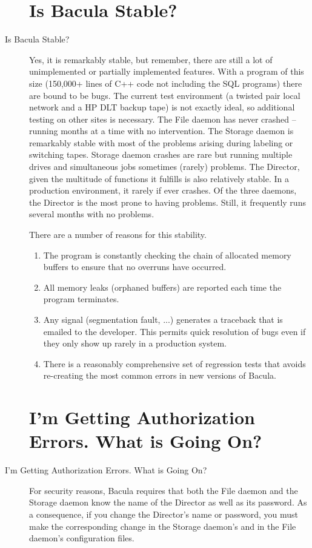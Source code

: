 \begin{description}
\label{stable}
\section{Is Bacula Stable?}
\item [Is Bacula Stable? ]
   Yes, it is remarkably stable, but remember, there are still a lot of
   unimplemented or partially implemented features.  With a program of this
   size (150,000+ lines of C++ code not including the SQL programs) there
   are bound to be bugs.  The current test environment (a twisted pair
   local network and a HP DLT backup tape) is not exactly ideal, so
   additional testing on other sites is necessary.  The File daemon has
   never crashed -- running months at a time with no intervention.  The
   Storage daemon is remarkably stable with most of the problems arising
   during labeling or switching tapes.  Storage daemon crashes are rare
   but running multiple drives and simultaneous jobs sometimes (rarely)
   problems.
   The Director, given the multitude of functions it fulfills is also
   relatively stable.  In a production environment, it rarely if ever
   crashes.  Of the three daemons, the Director is the most prone to having
   problems.  Still, it frequently runs several months with no problems.

   There are a number of reasons for this stability.  

   \begin{enumerate}
   \item  The program is constantly checking the chain of allocated
      memory buffers to ensure that no overruns have occurred.  \\
   \item All  memory leaks (orphaned buffers) are reported each time the
      program  terminates.\\
   \item Any signal (segmentation fault, ...) generates a 
      traceback that is emailed to the developer.  This permits quick
      resolution of bugs even if they only show up rarely in a production
      system.\\
   \item There is a reasonably comprehensive set of regression tests
      that avoids re-creating the most common errors in new versions of
      Bacula.
   \end{enumerate}

\label{AuthorizationErrors}
\section{I'm Getting Authorization Errors. What is Going On? }
\item [I'm Getting Authorization Errors. What is Going On? ]
   For security reasons, Bacula requires that both  the File daemon and the
   Storage daemon know the name  of the Director as well as its password. As a
   consequence,  if you change the Director's name or password, you must  make
   the corresponding change in the Storage daemon's and  in the File daemon's
   configuration files.  


\end{description}
